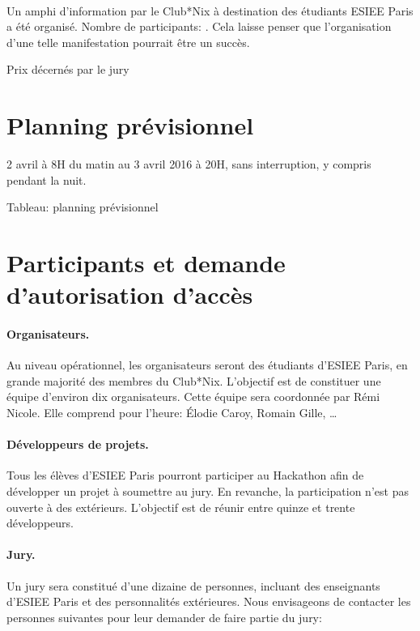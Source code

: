 \documentclass{article}
\begin{document}
\paragraph{}
Un amphi d'information par le Club*Nix à destination des étudiants ESIEE Paris
a été organisé. Nombre de participants: . Cela laisse penser que
l'organisation d'une telle manifestation pourrait être un succès.

Prix décernés par le jury

\section{Planning prévisionnel}
2 avril à 8H du matin au 3 avril 2016 à 20H, sans interruption, y compris
pendant la nuit.

Tableau: planning prévisionnel

\section{Participants et demande d'autorisation d'accès}

\paragraph{Organisateurs.} Au niveau opérationnel, les organisateurs seront des
étudiants d'ESIEE Paris, en grande majorité des membres du Club*Nix. L'objectif
est de constituer une équipe d'environ dix organisateurs. Cette équipe sera
coordonnée par Rémi Nicole. Elle comprend pour l'heure: Élodie Caroy, Romain
Gille, \ldots

\paragraph{Développeurs de projets.} Tous les  élèves d'ESIEE Paris pourront
participer au Hackathon afin de développer un projet à soumettre au jury. En
revanche, la participation n'est pas ouverte à des extérieurs. L'objectif est
de réunir entre quinze et trente développeurs.

\paragraph{Jury.} Un jury sera constitué d'une dizaine de personnes, incluant
des enseignants d'ESIEE Paris et des personnalités extérieures.  Nous
envisageons de contacter les personnes suivantes pour leur demander de faire
partie du jury:
\end{document}
